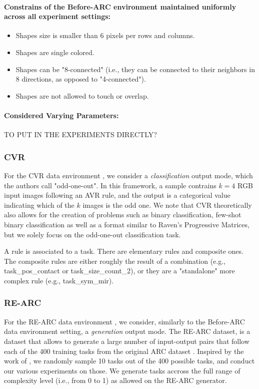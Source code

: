 \paragraph{Constrains of the Before-ARC environment maintained uniformly across all experiment settings:}
\begin{itemize}
    \item Shapes size is smaller than 6 pixels per rows and columns.
    \item Shapes are single colored.
    \item Shapes can be "8-connected" (i.e., they can be connected to their neighbors in 8 directions, as opposed to "4-connected").
    \item Shapes are not allowed to touch or overlap.
\end{itemize}

\paragraph{Considered Varying Parameters:} TO PUT IN THE EXPERIMENTS DIRECTLY? 

\subsubsection{CVR}

For the CVR data environment \cite{benchmark_for_compositional_visual_reasoning}, we consider a \textit{classification} output mode, which the authors call "odd-one-out". In this framework, a sample contrains $k=4$ RGB input images following an AVR rule, and the output is a categorical value indicating which of the $k$ images is the odd one. We note that CVR theoretically also allows for the creation of problems such as binary classification, few-shot binary classification as well as a format similar to Raven's Progressive Matrices, but we solely focus on the odd-one-out classification task. 

A rule is associated to a task. There are elementary rules and composite ones. The composite rules are either roughly the result of a combination (e.g., task\_pos\_contact or task\_size\_count\_2), or they are a "standalone" more complex rule (e.g., task\_sym\_mir).

\subsubsection{RE-ARC} \label{rearc}

For the RE-ARC data environment \cite{reverse_engineer_hodel}, we consider, similarly to the Before-ARC data environment setting, a \textit{generation} output mode. The RE-ARC dataset, is a dataset that allows to generate a large number of input-output pairs that follow each of the 400 training tasks from the original ARC dataset \cite{cholletARC}. Inspired by the work of \cite{arc_vit}, we randomly sample 10 tasks out of the 400 possible tasks, and conduct our various experiments on those. We generate tasks accross the full range of complexity level (i.e., from 0 to 1) as allowed on the RE-ARC generator. 

